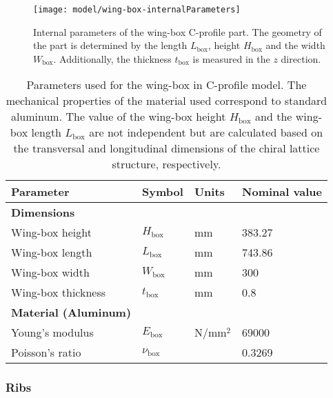 \begin{figure}[!htpb]
  \centering
  \texttt{[image: model/wing-box-internalParameters]}
  \caption[Internal parameters of the wing-box in C-profile part]{Internal parameters of the wing-box C-profile part. The geometry of the part is determined by the length $L_{\mathrm{box}}$, height $H_{\mathrm{box}}$ and the width $W_{\mathrm{box}}$. Additionally, the thickness $t_{\mathrm{box}}$ is measured in the $z$ direction.}\label{fig:wing-box-internalParameters}
\end{figure}

\begin{table}[!htpb]
\centering
\begin{tabular}{|l|lll|}
\hline
\textbf{Parameter} & \multicolumn{1}{l|}{\textbf{Symbol}} & \multicolumn{1}{l|}{\textbf{Units}} & \textbf{Nominal value} \\ \hline \hline
{\textbf{Dimensions}} &  &  &  \\ \hline
Wing-box height & \multicolumn{1}{l|}{$H_{\mathrm{box}}$} & \multicolumn{1}{l|}{mm} & 383.27 \\ \hline
Wing-box length & \multicolumn{1}{l|}{$L_{\mathrm{box}}$} & \multicolumn{1}{l|}{mm} & 743.86 \\ \hline
Wing-box width & \multicolumn{1}{l|}{$W_{\mathrm{box}}$} & \multicolumn{1}{l|}{mm} & 300 \\ \hline
Wing-box thickness & \multicolumn{1}{l|}{$t_{\mathrm{box}}$} & \multicolumn{1}{l|}{mm} & 0.8 \\ \hline \hline
{\textbf{Material (Aluminum)}} &  &  &  \\ \hline
Young's modulus & \multicolumn{1}{l|}{$E_{\mathrm{box}}$} & \multicolumn{1}{l|}{N/mm$^2$} & 69000 \\ \hline
Poisson's ratio & \multicolumn{1}{l|}{$\nu_{\mathrm{box}}$} & \multicolumn{1}{l|}{} & 0.3269 \\ \hline
\end{tabular}
\caption[Parameters used for the wing-box in C-profile model]{Parameters used for the wing-box in C-profile model. The mechanical properties of the material used correspond to standard aluminum. The value of the wing-box height $H_{\mathrm{box}}$ and the wing-box length $L_{\mathrm{box}}$ are not independent but are calculated based on the transversal and longitudinal dimensions of the chiral lattice structure, respectively.}
\label{tab:parameters_wing-box}
\end{table}

\clearpage
\subsubsection{Ribs} \label{subsubsec:Ribs_Parametrization}

